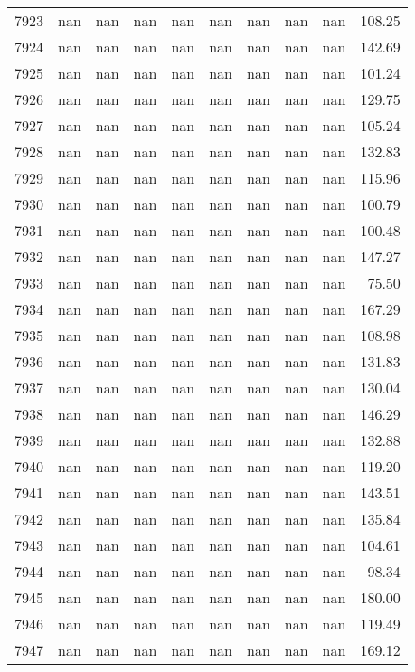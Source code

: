 \begin{tabular}{lrrrrrrrrr}
7923 & nan & nan & nan & nan & nan & nan & nan & nan & 108.25 \\
7924 & nan & nan & nan & nan & nan & nan & nan & nan & 142.69 \\
7925 & nan & nan & nan & nan & nan & nan & nan & nan & 101.24 \\
7926 & nan & nan & nan & nan & nan & nan & nan & nan & 129.75 \\
7927 & nan & nan & nan & nan & nan & nan & nan & nan & 105.24 \\
7928 & nan & nan & nan & nan & nan & nan & nan & nan & 132.83 \\
7929 & nan & nan & nan & nan & nan & nan & nan & nan & 115.96 \\
7930 & nan & nan & nan & nan & nan & nan & nan & nan & 100.79 \\
7931 & nan & nan & nan & nan & nan & nan & nan & nan & 100.48 \\
7932 & nan & nan & nan & nan & nan & nan & nan & nan & 147.27 \\
7933 & nan & nan & nan & nan & nan & nan & nan & nan & 75.50 \\
7934 & nan & nan & nan & nan & nan & nan & nan & nan & 167.29 \\
7935 & nan & nan & nan & nan & nan & nan & nan & nan & 108.98 \\
7936 & nan & nan & nan & nan & nan & nan & nan & nan & 131.83 \\
7937 & nan & nan & nan & nan & nan & nan & nan & nan & 130.04 \\
7938 & nan & nan & nan & nan & nan & nan & nan & nan & 146.29 \\
7939 & nan & nan & nan & nan & nan & nan & nan & nan & 132.88 \\
7940 & nan & nan & nan & nan & nan & nan & nan & nan & 119.20 \\
7941 & nan & nan & nan & nan & nan & nan & nan & nan & 143.51 \\
7942 & nan & nan & nan & nan & nan & nan & nan & nan & 135.84 \\
7943 & nan & nan & nan & nan & nan & nan & nan & nan & 104.61 \\
7944 & nan & nan & nan & nan & nan & nan & nan & nan & 98.34 \\
7945 & nan & nan & nan & nan & nan & nan & nan & nan & 180.00 \\
7946 & nan & nan & nan & nan & nan & nan & nan & nan & 119.49 \\
7947 & nan & nan & nan & nan & nan & nan & nan & nan & 169.12 \\

\end{tabular}
